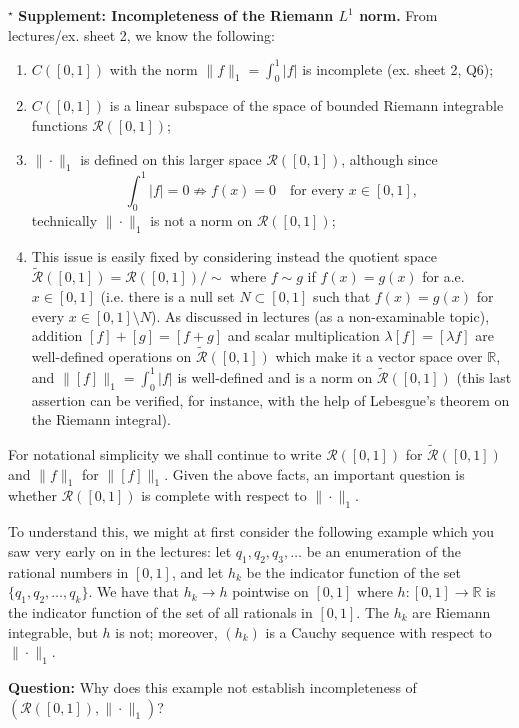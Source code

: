 $^\star$ \textbf{Supplement: Incompleteness of the Riemann $L^1$ norm.} From lectures/ex. sheet 2, we know the following:

\begin{enumerate}
\item[(i)] $C([0,1])$ with the norm $\|f\|_1=\int_0^1|f|$ is incomplete (ex. sheet 2, Q6);
\item[(ii)] $C([0,1])$ is a linear subspace of the space of bounded Riemann integrable functions $\mathcal R([0,1])$;
\item[(iii)] $\|\cdot\|_1$ is defined on this larger space $\mathcal R([0,1])$, although since
\[
\int_0^1|f|=0\not\Rightarrow f(x)=0\quad\text{for every } x\in[0,1],
\]
technically $\|\cdot\|_1$ is not a norm on $\mathcal R([0,1])$;
\item[(iv)] This issue is easily fixed by considering instead the quotient space $\widetilde{\mathcal R}([0,1])=\mathcal R([0,1])/\sim$ where $f\sim g$ if $f(x)=g(x)$ for a.e. $x\in[0,1]$ (i.e. there is a null set $N\subset[0,1]$ such that $f(x)=g(x)$ for every $x\in[0,1]\setminus N$). As discussed in lectures (as a non-examinable topic), addition $[f]+[g]=[f+g]$ and scalar multiplication $\lambda[f]=[\lambda f]$ are well-defined operations on $\widetilde{\mathcal R}([0,1])$ which make it a vector space over $\mathbb R$, and $\|[f]\|_1=\int_0^1|f|$ is well-defined and is a norm on $\widetilde{\mathcal R}([0,1])$ (this last assertion can be verified, for instance, with the help of Lebesgue’s theorem on the Riemann integral).
\end{enumerate}

For notational simplicity we shall continue to write $\mathcal R([0,1])$ for $\widetilde{\mathcal R}([0,1])$ and $\|f\|_1$ for $\|[f]\|_1$. Given the above facts, an important question is whether $\mathcal R([0,1])$ is complete with respect to $\|\cdot\|_1$.

To understand this, we might at first consider the following example which you saw very early on in the lectures: let $q_1,q_2,q_3,\ldots$ be an enumeration of the rational numbers in $[0,1]$, and let $h_k$ be the indicator function of the set $\{q_1,q_2,\ldots,q_k\}$. We have that $h_k\to h$ pointwise on $[0,1]$ where $h:[0,1]\to\mathbb R$ is the indicator function of the set of all rationals in $[0,1]$. The $h_k$ are Riemann integrable, but $h$ is not; moreover, $(h_k)$ is a Cauchy sequence with respect to $\|\cdot\|_1$.

\textbf{Question:} Why does this example not establish incompleteness of $(\mathcal R([0,1]),\|\cdot\|_1)$?

